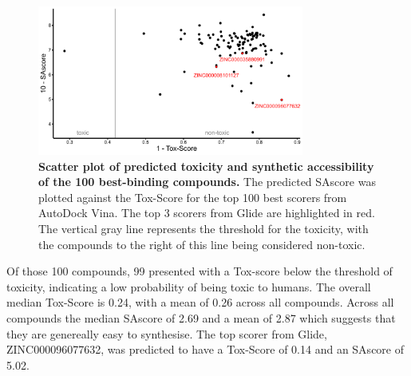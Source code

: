 \documentclass[11pt, letterpaper, titlepage]{article}
\begin{document}
\begin{figure}[h]
    \begin{center}
      \includegraphics[width=0.78\textwidth]{etoxpred_result.pdf}
    \end{center}
    \caption{\textbf{Scatter plot of predicted toxicity and synthetic accessibility of the 100 best-binding compounds.} The predicted \ac{SAscore} was plotted against the Tox-Score for the top 100 best scorers from AutoDock Vina. The top 3 scorers from Glide are highlighted in red. The vertical gray line represents the threshold for the toxicity, with the compounds to the right of this line being considered non-toxic.}\label{eToxPred}
  \end{figure}

\noindent Of those 100 compounds, 99 presented with a Tox-score below the threshold of toxicity, indicating a low probability of being toxic to humans. The overall median Tox-Score is 0.24, with a mean of 0.26 across all compounds. Across all compounds the median SAscore of 2.69 and a mean of 2.87 which suggests that they are genereally easy to synthesise. The top scorer from Glide, ZINC000096077632, was predicted to have a Tox-Score of 0.14 and an SAscore of 5.02.
\end{document}
